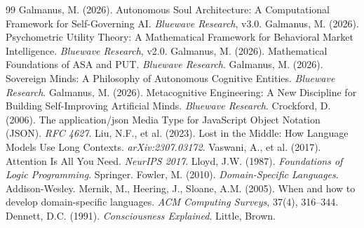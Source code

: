 \documentclass[12pt,a4paper]{article}
\theoremstyle{plain}
\theoremstyle{definition}
\theoremstyle{remark}
\begin{document}
\begin{thebibliography}{99}
 Galmanus, M. (2026). Autonomous Soul Architecture: A Computational Framework for Self-Governing AI. \textit{Bluewave Research}, v3.0.
 Galmanus, M. (2026). Psychometric Utility Theory: A Mathematical Framework for Behavioral Market Intelligence. \textit{Bluewave Research}, v2.0.
 Galmanus, M. (2026). Mathematical Foundations of ASA and PUT. \textit{Bluewave Research}.
 Galmanus, M. (2026). Sovereign Minds: A Philosophy of Autonomous Cognitive Entities. \textit{Bluewave Research}.
 Galmanus, M. (2026). Metacognitive Engineering: A New Discipline for Building Self-Improving Artificial Minds. \textit{Bluewave Research}.
 Crockford, D. (2006). The application/json Media Type for JavaScript Object Notation (JSON). \textit{RFC 4627}.
 Liu, N.F., et al. (2023). Lost in the Middle: How Language Models Use Long Contexts. \textit{arXiv:2307.03172}.
 Vaswani, A., et al. (2017). Attention Is All You Need. \textit{NeurIPS 2017}.
 Lloyd, J.W. (1987). \textit{Foundations of Logic Programming}. Springer.
 Fowler, M. (2010). \textit{Domain-Specific Languages}. Addison-Wesley.
 Mernik, M., Heering, J., Sloane, A.M. (2005). When and how to develop domain-specific languages. \textit{ACM Computing Surveys}, 37(4), 316--344.
 Dennett, D.C. (1991). \textit{Consciousness Explained}. Little, Brown.
\end{thebibliography}
\end{document}
